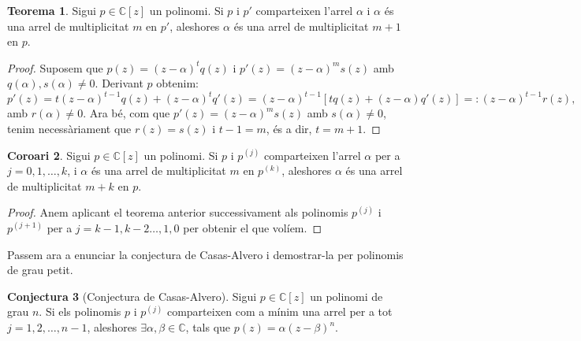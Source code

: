 \documentclass[11pt,a4paper]{article}
\theoremstyle{definition}
\newtheorem{theorem}{Teorema}
\newtheorem{conjecture}[theorem]{Conjectura}
\newtheorem{corollary}[theorem]{Coro\lgem ari}
\newcommand{\CC}{\ensuremath{\mathbb{C}}}
\begin{document}
\begin{theorem}\label{teo5}
    Sigui $p\in\CC[z]$ un polinomi. Si $p$ i $p'$ comparteixen l'arrel $\alpha$ i $\alpha$ és una arrel de multiplicitat $m$ en $p'$, aleshores $\alpha$ és una arrel de multiplicitat $m+1$ en $p$.
\end{theorem}
\begin{proof}
    Suposem que $p(z)=(z-\alpha)^tq(z)$ i $p'(z)=(z-\alpha)^ms(z)$ amb $q(\alpha),s(\alpha)\ne 0$. Derivant $p$ obtenim:
    $$p'(z)=t(z-\alpha)^{t-1}q(z)+(z-\alpha)^tq'(z)=(z-\alpha)^{t-1}[tq(z)+(z-\alpha)q'(z)]=:(z-\alpha)^{t-1}r(z),$$ amb $r(\alpha)\ne 0$.
    Ara bé, com que $p'(z)=(z-\alpha)^ms(z)$ amb $s(\alpha)\ne 0$, tenim necessàriament que $r(z)=s(z)$ i $t-1=m$, és a dir, $t=m+1$.
\end{proof}
\begin{corollary}\label{coro2}
    Sigui $p\in\CC[z]$ un polinomi. Si $p$ i $p^{(j)}$ comparteixen l'arrel $\alpha$ per a $j=0,1,\ldots,k$, i $\alpha$ és una arrel de multiplicitat $m$ en $p^{(k)}$, aleshores $\alpha$ és una arrel de multiplicitat $m+k$ en $p$.
\end{corollary}
\begin{proof}
    Anem aplicant el teorema anterior successivament als polinomis $p^{(j)}$ i $p^{(j+1)}$ per a $j=k-1,k-2\ldots,1,0$ per obtenir el que volíem.
\end{proof}
Passem ara a enunciar la conjectura de Casas-Alvero i demostrar-la per polinomis de grau petit.
\begin{conjecture}[Conjectura de Casas-Alvero]
    Sigui $p\in\CC[z]$ un polinomi de grau $n$. Si els polinomis $p$ i $p^{(j)}$ comparteixen com a mínim una arrel per a tot $j=1,2,\ldots,n-1$, aleshores $\exists \alpha,\beta\in\CC$, tals que $p(z)=\alpha(z-\beta)^n$.
\end{conjecture}
\end{document}
